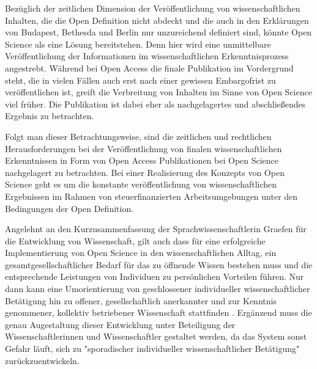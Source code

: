 Bezüglich der zeitlichen Dimension der Veröffentlichung von wissenschaftlichen Inhalten, die die Open Definition nicht abdeckt und die auch in den Erklärungen von Budapest, Bethesda und Berlin nur unzureichend definiert sind, könnte Open Science als eine Lösung bereitstehen. Denn hier wird eine unmittelbare Veröffentlichung der Informationen im wissenschaftlichen Erkenntnisprozess angestrebt. Während bei Open Access die finale Publikation im Vordergrund steht, die in vielen Fällen auch erst nach einer gewissen Embargofrist zu veröffentlichen ist, greift die Verbreitung von Inhalten im Sinne von Open Science viel früher. Die Publikation ist dabei eher als nachgelagertes und abschließendes Ergebnis zu betrachten.

Folgt man dieser Betrachtungsweise, sind die zeitlichen und rechtlichen Herausforderungen bei der Veröffentlichung von finalen wissenschaftlichen Erkenntnissen in Form von Open Access Publikationen bei Open Science nachgelagert zu betrachten. Bei einer Realisierung des Konzepts von Open Science geht es um die konstante veröffentlichung von wissenschaftlichen Ergebnissen im Rahmen von steuerfinanzierten Arbeitsumgebungen unter den Bedingungen der Open Definition.

Angelehnt an den Kurzusammenfassung der Sprachwissenschaftlerin Graefen für die Entwicklung von Wissenschaft, gilt auch dass für eine erfolgreiche Implementierung von Open Science in den wissenschaftlichen Alltag, ein gesamtgesellschaftlicher Bedarf für das zu öffnende Wissen bestehen muss und die entsprechende Leistungen von Individuen zu persönlichen Vorteilen führen. Nur dann kann eine Umorientierung von geschlossener individueller wissenschaftlicher Betätigung hin zu offener, gesellschaftlich anerkannter und zur Kenntnis genommener, kollektiv betriebener Wissenschaft stattfinden \cite{graefen2007_wissenschaftliche_artikel}. Ergänzend muss die genau Augestaltung dieser Entwicklung unter Beteiligung der Wissenschaftlerinnen und Wissenschaftler gestaltet werden, da das System sonst Gefahr läuft, sich zu "sporadischer individueller wissenschaftlicher Betätigung" \cite{graefen2007_wissenschaftliche_artikel} zurückzuentwickeln.

